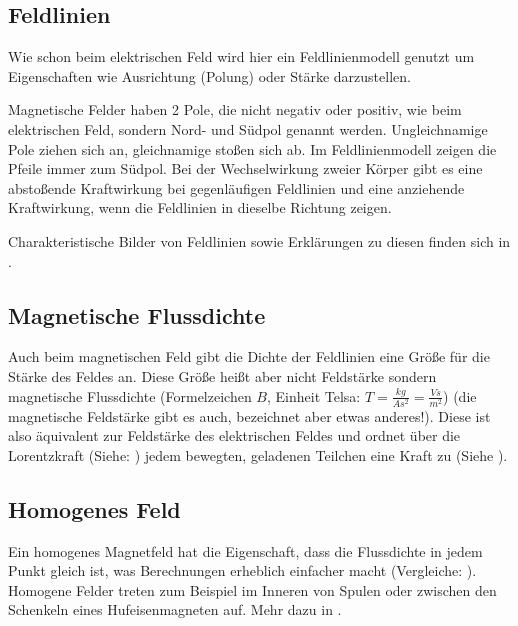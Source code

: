 \subsection{Feldlinien}

Wie schon beim elektrischen Feld wird hier ein Feldlinienmodell genutzt um Eigenschaften wie Ausrichtung (Polung) oder Stärke darzustellen. 

Magnetische Felder haben 2 Pole, die nicht negativ oder positiv, wie beim elektrischen Feld, sondern Nord- und Südpol genannt werden. Ungleichnamige Pole ziehen sich an, gleichnamige stoßen sich ab. Im Feldlinienmodell zeigen die Pfeile immer zum Südpol. Bei der Wechselwirkung zweier Körper gibt es eine abstoßende Kraftwirkung bei gegenläufigen Feldlinien und eine anziehende Kraftwirkung, wenn die Feldlinien in dieselbe Richtung zeigen.

Charakteristische Bilder von Feldlinien sowie Erklärungen zu diesen finden sich in .


\subsection{Magnetische Flussdichte}

Auch beim magnetischen Feld gibt die Dichte der Feldlinien eine Größe für die Stärke des Feldes an. Diese Größe heißt aber nicht Feldstärke sondern \glqq magnetische Flussdichte \grqq{} (Formelzeichen $B$, Einheit \glqq Telsa\grqq : $T=\frac{kg}{As^2}=\frac{Vs}{m^2}$) (die magnetische Feldstärke gibt es auch, bezeichnet aber etwas anderes!). Diese ist also äquivalent zur Feldstärke des elektrischen Feldes und ordnet über die Lorentzkraft (Siehe: ) jedem bewegten, geladenen Teilchen eine Kraft zu (Siehe ).


\subsection{Homogenes Feld} \label{subsec:MFeldHomogen}

Ein homogenes Magnetfeld hat die Eigenschaft, dass die Flussdichte in jedem Punkt gleich ist, was Berechnungen erheblich einfacher macht (Vergleiche: ). Homogene Felder treten zum Beispiel im Inneren von Spulen oder zwischen den Schenkeln eines Hufeisenmagneten auf. Mehr dazu in .

















